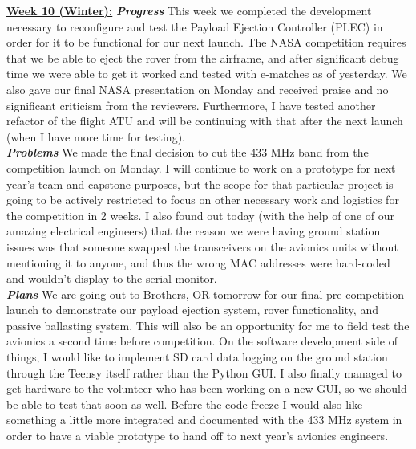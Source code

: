 \documentclass[onecolumn, draftclsnofoot, 10pt, compsoc]{IEEEtran}
\begin{document}
\underline{\textbf{Week 10 (Winter):}}
\newline\textbf{\textit{{Progress}}}
\newline This week we completed the development necessary to reconfigure and test the Payload Ejection Controller (PLEC) in order for it to be functional for our next launch. The NASA competition requires that we be able to eject the rover from the airframe, and after significant debug time we were able to get it worked and tested with e-matches as of yesterday. We also gave our final NASA presentation on Monday and received praise and no significant criticism from the reviewers. Furthermore, I have tested another refactor of the flight ATU and will be continuing with that after the next launch (when I have more time for testing). \\

\textbf{\textit{{Problems}}}
\newline We made the final decision to cut the 433 MHz band from the competition launch on Monday. I will continue to work on a prototype for next year's team and capstone purposes, but the scope for that particular project is going to be actively restricted to focus on other necessary work and logistics for the competition in 2 weeks. I also found out today (with the help of one of our amazing electrical engineers) that the reason we were having ground station issues was that someone swapped the transceivers on the avionics units without mentioning it to anyone, and thus the wrong MAC addresses were hard-coded and wouldn't display to the serial monitor. \\

\textbf{\textit{{Plans}}}
\newline We are going out to Brothers, OR tomorrow for our final pre-competition launch to demonstrate our payload ejection system, rover functionality, and passive ballasting system. This will also be an opportunity for me to field test the avionics a second time before competition. On the software development side of things, I would like to implement SD card data logging on the ground station through the Teensy itself rather than the Python GUI. I also finally managed to get hardware to the volunteer who has been working on a new GUI, so we should be able to test that soon as well. Before the code freeze I would also like something a little more integrated and documented with the 433 MHz system in order to have a viable prototype to hand off to next year's avionics engineers. \\
\end{document}

